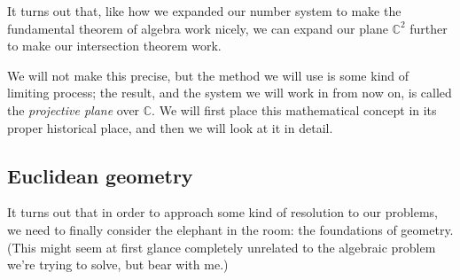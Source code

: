 \documentclass[a4paper,leqno,10pt]{article}
\theoremstyle{exercise}
\theoremstyle{plain}
\theoremstyle{definition}
\theoremstyle{remark}
\begin{document}
It turns out that, like how we expanded our number system to make the fundamental theorem of algebra work
nicely, we can expand our plane $ \mathbb{C}^2 $ further to make our intersection theorem work.

We will not make this precise, but the method we will use is some kind of limiting process; the result, and the
system we will work in from now on, is called the \emph{projective plane} over $ \mathbb{C} $. We will first place
this mathematical concept in its proper historical place, and then we will look at it in detail.

\subsection{Euclidean geometry}
It turns out that in order to approach some kind of resolution to our problems, we need to finally consider the
elephant in the room: the foundations of geometry. (This might seem at first glance completely unrelated to the
algebraic problem we're trying to solve, but bear with me.)
\end{document}
